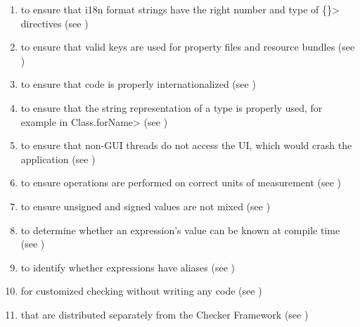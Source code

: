 \begin{enumerate}
  )
\item
  to ensure that i18n format strings have the right number and type of
  \<\{\}> directives (see )
\item
   to ensure that valid
  keys are used for property files and resource bundles (see
  )
\item
   to
  ensure that code is properly internationalized (see
  )
\item
   to ensure that the
  string representation of a type is properly used, for example in
  \<Class.forName> (see )
\item
   to ensure that non-GUI
  threads do not access the UI, which would crash the application
  (see )
\item
   to ensure operations are
  performed on correct units of measurement
  (see )
\item
   to
  ensure unsigned and signed values are not mixed
  (see )
\item
   to determine
  whether an expression's value can be known at compile time
  (see )
\item
   to identify whether
  expressions have aliases (see )
\item
   for customized checking without
  writing any code (see )
\item
   that are distributed
  separately from the Checker Framework
  (see )

\end{enumerate}

